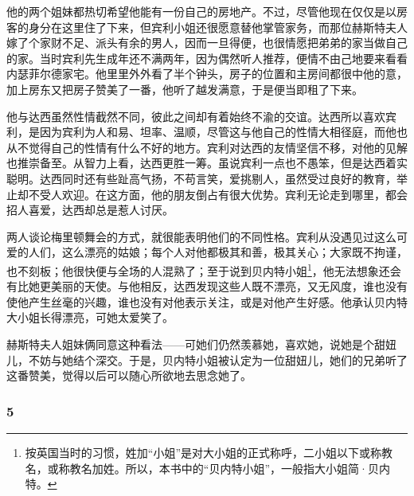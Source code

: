 \par 他的两个姐妹都热切希望他能有一份自己的房地产。不过，尽管他现在仅仅是以房客的身分在这里住了下来，但宾利小姐还很愿意替他掌管家务，而那位赫斯特夫人嫁了个家财不足、派头有余的男人，因而一旦得便，也很情愿把弟弟的家当做自己的家。当时宾利先生成年还不满两年，因为偶然听人推荐，便情不由己地要来看看内瑟菲尔德家宅。他里里外外看了半个钟头，房子的位置和主房间都很中他的意，加上房东又把房子赞美了一番，他听了越发满意，于是便当即租了下来。
\par 他与达西虽然性情截然不同，彼此之间却有着始终不渝的交谊。达西所以喜欢宾利，是因为宾利为人和易、坦率、温顺，尽管这与他自己的性情大相径庭，而他也从不觉得自己的性情有什么不好的地方。宾利对达西的友情坚信不移，对他的见解也推崇备至。从智力上看，达西更胜一筹。虽说宾利一点也不愚笨，但是达西着实聪明。达西同时还有些趾高气扬，不苟言笑，爱挑剔人，虽然受过良好的教育，举止却不受人欢迎。在这方面，他的朋友倒占有很大优势。宾利无论走到哪里，都会招人喜爱，达西却总是惹人讨厌。
\par 两人谈论梅里顿舞会的方式，就很能表明他们的不同性格。宾利从没遇见过这么可爱的人们，这么漂亮的姑娘；每个人对他都极其和善，极其关心；大家既不拘谨，也不刻板；他很快便与全场的人混熟了；至于说到贝内特小姐\footnote{按英国当时的习惯，姓加“小姐”是对大小姐的正式称呼，二小姐以下或称教名，或称教名加姓。所以，本书中的“贝内特小姐”，一般指大小姐简·贝内特。}，他无法想象还会有比她更美丽的天使。与他相反，达西发现这些人既不漂亮，又无风度，谁也没有使他产生丝毫的兴趣，谁也没有对他表示关注，或是对他产生好感。他承认贝内特大小姐长得漂亮，可她太爱笑了。
\par 赫斯特夫人姐妹俩同意这种看法——可她们仍然羡慕她，喜欢她，说她是个甜妞儿，不妨与她结个深交。于是，贝内特小姐被认定为一位甜妞儿，她们的兄弟听了这番赞美，觉得以后可以随心所欲地去思念她了。


\subsubsection*{5}

